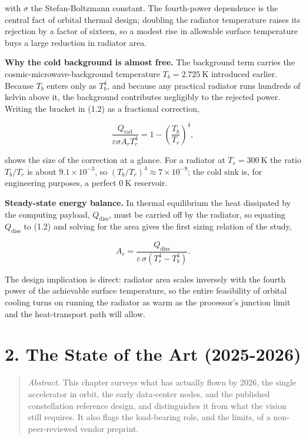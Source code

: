\documentclass[
  11pt,
  openany,
  oneside]{book}
\begin{document}
with \(\sigma\) the Stefan-Boltzmann constant. The fourth-power
dependence is the central fact of orbital thermal design; doubling the
radiator temperature raises its rejection by a factor of sixteen, so a
modest rise in allowable surface temperature buys a large reduction in
radiator area.

\textbf{Why the cold background is almost free.} The background term
carries the cosmic-microwave-background temperature
\(T_{b} = 2.725\ \text{K}\) introduced earlier. Because \(T_{b}\) enters
only as \(T_{b}^{4}\), and because any practical radiator runs hundreds
of kelvin above it, the background contributes negligibly to the
rejected power. Writing the bracket in (1.2) as a fractional correction,

\begin{equation}
\frac{Q_{\text{rad}}}{\varepsilon \sigma A_{r} T_{r}^{4}} = 1 - \left(\frac{T_{b}}{T_{r}}\right)^{4}, \tag{1.3}
\end{equation}

shows the size of the correction at a glance. For a radiator at
\(T_{r} = 300\ \text{K}\) the ratio \(T_{b}/T_{r}\) is about
\(9.1\times 10^{-3}\), so \((T_{b}/T_{r})^{4}\approx 7\times 10^{-9}\);
the cold sink is, for engineering purposes, a perfect \(0\ \text{K}\)
reservoir.

\textbf{Steady-state energy balance.} In thermal equilibrium the heat
dissipated by the computing payload, \(Q_{\text{diss}}\), must be
carried off by the radiator, so equating \(Q_{\text{diss}}\) to (1.2)
and solving for the area gives the first sizing relation of the study,

\begin{equation}
A_{r} = \frac{Q_{\text{diss}}}{\varepsilon\, \sigma\left(T_{r}^{4} - T_{b}^{4}\right)}. \tag{1.4}
\end{equation}

The design implication is direct: radiator area scales inversely with
the fourth power of the achievable surface temperature, so the entire
feasibility of orbital cooling turns on running the radiator as warm as
the processor's junction limit and the heat-transport path will allow.

\chapter{2. The State of the Art
(2025-2026)}\label{the-state-of-the-art-2025-2026}

\begin{quote}
\emph{Abstract.} This chapter surveys what has actually flown by 2026,
the single accelerator in orbit, the early data-center nodes, and the
published constellation reference design, and distinguishes it from what
the vision still requires. It also flags the load-bearing role, and the
limits, of a non-peer-reviewed vendor preprint.
\end{quote}
\end{document}

